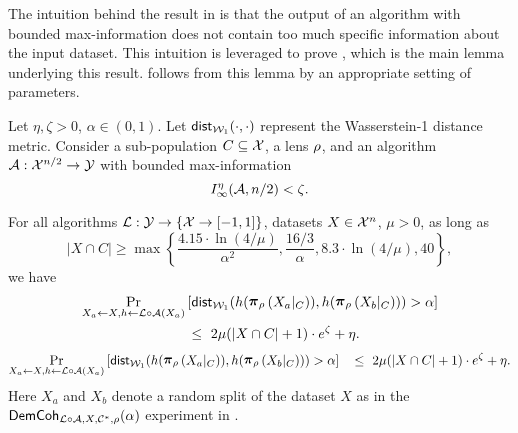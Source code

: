 \noindent
The intuition behind the result in  is that the output of an algorithm with bounded max-information does not contain too much specific information about the input dataset. This intuition is leveraged to prove , which is the main lemma underlying this result.  follows from this lemma by an appropriate setting of parameters.


\begin{lemma}\label{lemma:max-info-implies-demographic-coherence-int}
    Let $\eta,\zeta>0$, $\alpha \in (0,1)$. Let $\mathsf{dist}_{\mathcal{W}_1}(\cdot,\cdot)$ represent the Wasserstein-1 distance metric. Consider a sub-population $C \subseteq \mathcal{X}$, a lens $\rho$, and an algorithm ${\mathcal{A}:\mathcal{X}^{n/2}\to \mathcal{Y}}$ with bounded max-information 
    $$I^\eta_{\infty}(\mathcal{A},n/2) < \zeta.$$ 

    \noindent
    For all algorithms $\mathcal{L}: \mathcal{Y} \to \{ \mathcal{X} \to [-1,1] \}$, datasets $X\in\mathcal{X}^n$, $\mu > 0$, as long as 
    \[|X\cap C|\ge \max\left\{\frac{4.15\cdot\ln(4/\mu)}{\alpha^2}, \frac{16/3}{\alpha}, 8.3\cdot\ln(4/\mu), 40\right\},\]   
    we have
\ifnum{}
   \begin{align*}
    \underset{X_a \leftarrow X, h \leftarrow \cL \circ \alg(X_a)}{\Pr}&\left[\wdist(h(\restrict{X_a\lvert_C}{\rho}), h(\restrict{X_b\lvert_C}{\rho})) > \alpha\right] \\
    & \,\leq\,\, 2\mu(|X\cap C|+1)\cdot e^\zeta + \eta.
    \end{align*} 
\else
 \begin{align*}
    \underset{X_a \leftarrow X, h \leftarrow \cL \circ \alg(X_a)}{\Pr}&\left[\wdist(h(\restrict{X_a\lvert_C}{\rho}), h(\restrict{X_b\lvert_C}{\rho})) > \alpha\right]
    & \,\leq\,\, 2\mu(|X\cap C|+1)\cdot e^\zeta + \eta.
    \end{align*} 
\fi
    Here $X_a$ and $X_b$ denote a random split of the dataset $X$ as in the $\mathsf{DemCoh}_{\mathcal{L}\circ\mathcal{A},X,\mathcal{C}^*,\rho}(\alpha)$ experiment in .
\end{lemma}

